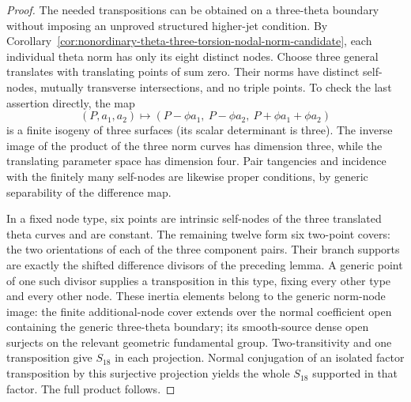 \begin{proof}
The needed transpositions can be obtained on a three-theta
boundary without imposing an unproved structured higher-jet
condition. By
Corollary~\ref{cor:nonordinary-theta-three-torsion-nodal-norm-candidate},
each individual theta norm has only its eight distinct nodes.
Choose three general translates with translating points of sum
zero. Their norms have distinct self-nodes, mutually transverse
intersections, and no triple points. To check the last assertion
directly, the map
\[
 (P,a_1,a_2)\longmapsto(P-\phi a_1,\ P-\phi a_2,\ P+\phi a_1+\phi a_2)
\]
is a finite \etale isogeny of three surfaces (its scalar
determinant is three). The inverse image of the product of
the three norm curves has dimension three, while the translating
parameter space has dimension four. Pair tangencies and incidence
with the finitely many self-nodes are likewise proper conditions,
by generic separability of the difference map.

In a fixed node type, six points are intrinsic self-nodes of the
three translated theta curves and are constant. The remaining
twelve form six two-point covers: the two orientations of each
of the three component pairs. Their branch supports are exactly
the shifted difference divisors of the preceding lemma. A
generic point of one such divisor supplies a transposition in
this type, fixing every other type and every other node.
These inertia elements belong to the generic norm-node image:
the finite \etale additional-node cover extends over the normal
coefficient open containing the generic three-theta boundary;
its smooth-source dense open surjects on the relevant geometric
fundamental group. Two-transitivity and one transposition give
$S_{18}$ in each projection. Normal conjugation of an isolated
factor transposition by this surjective projection yields the
whole $S_{18}$ supported in that factor. The full product follows.
\end{proof}

